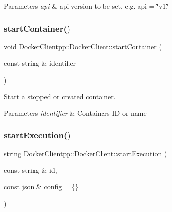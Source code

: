 \begin{DoxyParams}{Parameters}
{\em api} & api version to be set. e.\+g. api = \char`\"{}v1.\char`\"{} \\
\hline
\end{DoxyParams}
\mbox{\label{classDockerClientpp_1_1DockerClient_af9a0df84fcdfb1d698e8bcca5207360e}} 
\subsubsection{\texorpdfstring{startContainer()}{startContainer()}}
{\footnotesize\ttfamily void Docker\+Clientpp\+::\+Docker\+Client\+::start\+Container (\begin{DoxyParamCaption}\item[{const string \&}]{identifier }\end{DoxyParamCaption})}



Start a stopped or created container. 


\begin{DoxyParams}{Parameters}
{\em identifier} & Container\textquotesingle{}s ID or name \\
\hline
\end{DoxyParams}
\mbox{\label{classDockerClientpp_1_1DockerClient_ac330f9f09ebd50ce63dbda0b55bbb6d7}} 
\subsubsection{\texorpdfstring{startExecution()}{startExecution()}}
{\footnotesize\ttfamily string Docker\+Clientpp\+::\+Docker\+Client\+::start\+Execution (\begin{DoxyParamCaption}\item[{const string \&}]{id,  }\item[{const json \&}]{config = {\ttfamily \{\}} }\end{DoxyParamCaption})}



